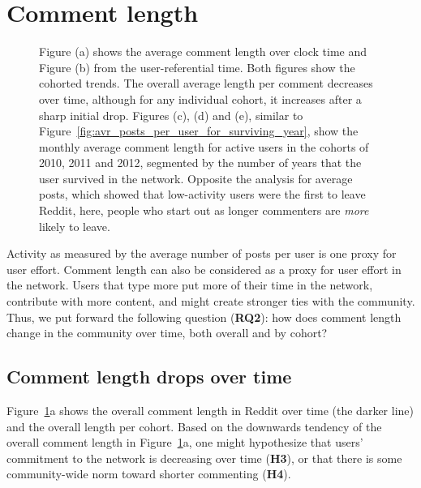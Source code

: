 \documentclass[10pt, oneside, onecolumn]{article}
\begin{document}
\vspace{7pt} 
\section{Comment length}

\begin{figure}[!tb]
\centering
{}
\caption{Figure (a) shows the average comment length over clock time and Figure (b) from the user-referential time. Both figures show the cohorted trends.  The overall average length per comment decreases over time, although for any individual cohort, it increases after a sharp initial drop. Figures (c), (d) and (e), similar to Figure~\ref{fig:avr_posts_per_user_for_surviving_year}, show the monthly average comment length for active users in the cohorts of 2010, 2011 and 2012, segmented by the number of years that the user survived in the network.  Opposite the analysis for average posts, which showed that low-activity users were the first to leave Reddit, here, people who start out as longer commenters are \textit{more} likely to leave.}
\label{fig:comment_length}
\end{figure}

Activity as measured by the average number of posts per user is one proxy for user effort.  Comment length can also be considered as a proxy for user effort in the network.  Users that type more put more of their time in the network, contribute with more content, and might create stronger ties with the community. Thus, we put forward the following question (\textbf{RQ2}): how does comment length change in the community over time, both overall and by cohort?

\subsection{Comment length drops over time}

Figure~\ref{fig:comment_length}a shows the overall comment length in Reddit over time (the darker line) and the overall length per cohort. 
Based on the downwards tendency of the overall comment length in Figure~\ref{fig:comment_length}a, one might hypothesize that users' commitment to the network is decreasing over time (\textbf{H3}), or that there is some community-wide norm toward shorter commenting (\textbf{H4}). 
\end{document}

